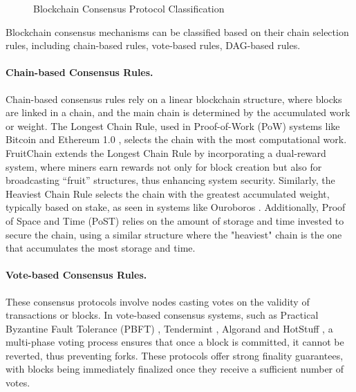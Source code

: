 \begin{figure*}[ht]
\caption{Blockchain Consensus Protocol Classification}
\end{figure*}

Blockchain consensus mechanisms can be classified based on their chain selection rules, including chain-based rules, vote-based rules, DAG-based rules.

\paragraph{Chain-based Consensus Rules.} 
Chain-based consensus rules rely on a linear blockchain structure, where blocks are linked in a chain, and the main chain is determined by the accumulated work or weight. 
The Longest Chain Rule, used in Proof-of-Work (PoW) systems like Bitcoin \cite{nakamoto2008bitcoin} and Ethereum 1.0 \cite{wood2014ethereum}, selects the chain with the most computational work. FruitChain \cite{pass2017fruitchains} extends the Longest Chain Rule by incorporating a dual-reward system, where miners earn rewards not only for block creation but also for broadcasting ``fruit'' structures, thus enhancing system security. 
Similarly, the Heaviest Chain Rule selects the chain with the greatest accumulated weight, typically based on stake, as seen in systems like Ouroboros \cite{kiayias2017ouroboros}. Additionally, Proof of Space and Time (PoST) \cite{moran2019simple} relies on the amount of storage and time invested to secure the chain, using a similar structure where the "heaviest" chain is the one that accumulates the most storage and time.

\paragraph{Vote-based Consensus Rules.} 
These consensus protocols involve nodes casting votes on the validity of transactions or blocks. 
In vote-based consensus systems, such as Practical Byzantine Fault Tolerance (PBFT) \cite{castro1999practical}, Tendermint \cite{buchman2016tendermint}, Algorand \cite{chen2019algorand} and HotStuff \cite{yin2019hotstuff}, a multi-phase voting process ensures that once a block is committed, it cannot be reverted, thus preventing forks. 
These protocols offer strong finality guarantees, with blocks being immediately finalized once they receive a sufficient number of votes.

